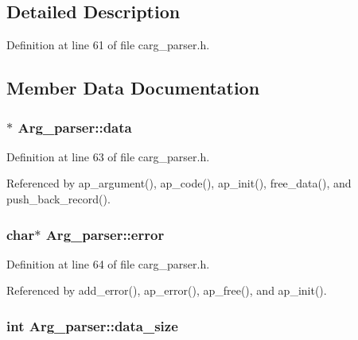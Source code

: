\subsection{Detailed Description}


Definition at line 61 of file carg\_\-parser.h.



\subsection{Member Data Documentation}
\hypertarget{structArg__parser_af9d6960e35a9e4156790adbd085c9e31}{
\subsubsection[{data}]{$\ast$ {\bf Arg\_\-parser::data}}}
\label{d3/d3f/structArg__parser_af9d6960e35a9e4156790adbd085c9e31}


Definition at line 63 of file carg\_\-parser.h.



Referenced by ap\_\-argument(), ap\_\-code(), ap\_\-init(), free\_\-data(), and push\_\-back\_\-record().

\hypertarget{structArg__parser_ab79bfc3b12298a8b0c0aad3e3a93f0c1}{
\subsubsection[{error}]{\setlength{\rightskip}{0pt plus 5cm}char$\ast$ {\bf Arg\_\-parser::error}}}
\label{d3/d3f/structArg__parser_ab79bfc3b12298a8b0c0aad3e3a93f0c1}


Definition at line 64 of file carg\_\-parser.h.



Referenced by add\_\-error(), ap\_\-error(), ap\_\-free(), and ap\_\-init().

\hypertarget{structArg__parser_a005a55925acfc47d3b05725c9ac0ccc8}{
\subsubsection[{data\_\-size}]{\setlength{\rightskip}{0pt plus 5cm}int {\bf Arg\_\-parser::data\_\-size}}}
\label{d3/d3f/structArg__parser_a005a55925acfc47d3b05725c9ac0ccc8}


